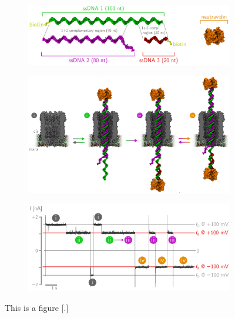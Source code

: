 \begin{figure}[ht]
  \begin{centering}
  \begin{subfigure}[t]{\dimexpr.8\linewidth-1.3em\relax}
  \centering
  \includegraphics[width=\linewidth,valign=t]{Figures/RConstruction1.png}
  \end{subfigure}%
  \vspace{0.5cm}
  \begin{subfigure}[t]{\dimexpr.8\linewidth-1.3em\relax}
  \centering
  \includegraphics[width=\linewidth,valign=t]{Figures/RConstruction2.png}
  \end{subfigure}%
  \vspace{0.5cm}
  \begin{subfigure}[t]{\dimexpr.8\linewidth-1.3em\relax}
  \centering
  \includegraphics[width=\linewidth,valign=t]{Figures/RConstruction3.png}
  \end{subfigure}
  \caption{This is a figure [.]}
  \label{fig:test}
  \end{centering}
\end{figure}
